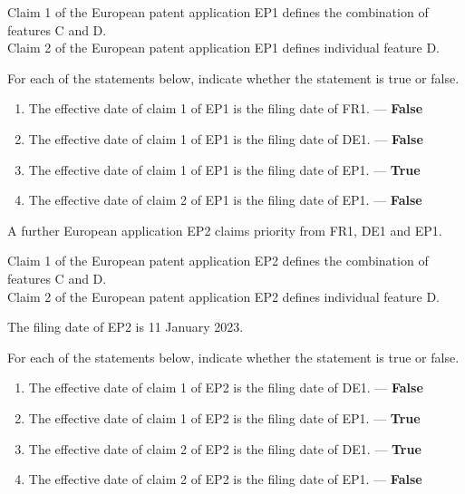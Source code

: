 \documentclass{report}
\newcommand{\T}{--- \textbf{True} }
\newcommand{\F}{--- \textbf{False} }
\begin{document}
\begin{enumerate}[label=\textbf{Answer \arabic*}]
\begin{enumerate}[label=\textbf{Answer \arabic*}]
    \vspace{1em}
    Claim 1 of the European patent application EP1 defines the combination of features C and D. \\
    Claim 2 of the European patent application EP1 defines individual feature D.
    
    \vspace{1em}
    For each of the statements below, indicate whether the statement is true or false.
    
    \begin{enumerate}[label=(\alph*)]
        \item The effective date of claim 1 of EP1 is the filing date of FR1. \F
        \item The effective date of claim 1 of EP1 is the filing date of DE1. \F
        \item The effective date of claim 1 of EP1 is the filing date of EP1. \T
        \item The effective date of claim 2 of EP1 is the filing date of EP1. \F
    \end{enumerate}
    
    \vspace{1em}
    A further European application EP2 claims priority from FR1, DE1 and EP1.
    
    \vspace{0.5em}
    Claim 1 of the European patent application EP2 defines the combination of features C and D. \\
    Claim 2 of the European patent application EP2 defines individual feature D.
    
    \vspace{0.5em}
    The filing date of EP2 is 11 January 2023.
    
    \vspace{1em}
    For each of the statements below, indicate whether the statement is true or false.
    \begin{enumerate}[label=(\alph*), resume]
        \item The effective date of claim 1 of EP2 is the filing date of DE1. \F
        \item The effective date of claim 1 of EP2 is the filing date of EP1. \T
        \item The effective date of claim 2 of EP2 is the filing date of DE1. \T
        \item The effective date of claim 2 of EP2 is the filing date of EP1. \F
    \end{enumerate}


\end{enumerate}
\end{enumerate}
\end{document}
